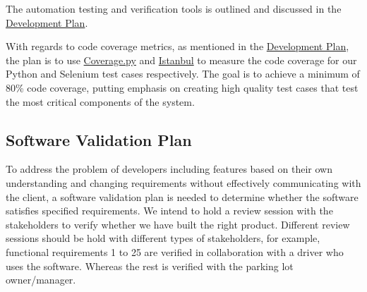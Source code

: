 \documentclass[12pt, titlepage]{article}
\begin{document}


  
The automation testing and verification tools is outlined and discussed in the
\href{https://github.com/parkd-app/park-d/blob/main/docs/DevelopmentPlan/DevelopmentPlan.pdf}{Development
Plan}.

With regards to code coverage metrics, as mentioned in the
\href{https://github.com/parkd-app/park-d/blob/main/docs/DevelopmentPlan/DevelopmentPlan.pdf}{Development
Plan}, the plan is to use
\href{https://coverage.readthedocs.io/en/6.5.0/}{Coverage.py} and
\href{https://istanbul.js.org/}{Istanbul} to measure the code coverage for our
Python and Selenium test cases respectively. The goal is to achieve a minimum of
80\% code coverage, putting emphasis on creating high quality test cases that
test the most critical components of the system.

\subsection{Software Validation Plan}
\label{sec:validation}

To address the problem of developers including features based on their own
understanding and changing requirements without effectively communicating with
the client, a software validation plan is needed to determine whether the
software satisfies specified requirements. We intend to hold a review session
with the stakeholders to verify whether we have built the right product.
Different review sessions should be hold with different types of stakeholders,
for example, functional requirements 1 to 25 are verified in collaboration with
a driver who uses the software. Whereas the rest is verified with the parking
lot owner/manager.
\end{document}
